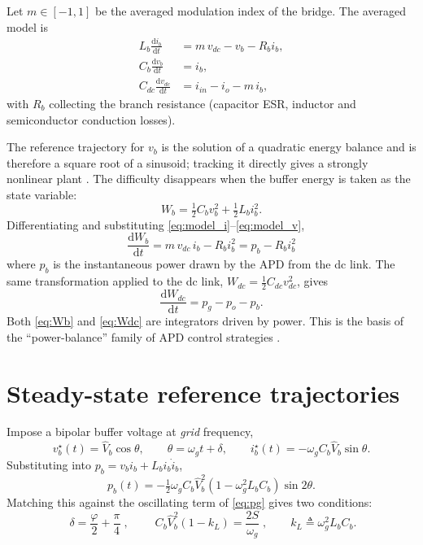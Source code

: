 \documentclass[11pt,a4paper]{article}
\newcommand{\dif}{\mathrm{d}}
\begin{document}
Let $m\in[-1,1]$ be the averaged modulation index of the bridge. The averaged
model is
\begin{align}
L_b\frac{\dif i_b}{\dif t} &= m\,v_{dc} - v_b - R_b i_b, \label{eq:model_i}\\
C_b\frac{\dif v_b}{\dif t} &= i_b, \label{eq:model_v}\\
C_{dc}\frac{\dif v_{dc}}{\dif t} &= i_{in} - i_o - m\,i_b, \label{eq:model_vdc}
\end{align}
with $R_b$ collecting the branch resistance (capacitor ESR, inductor and
semiconductor conduction losses).

The reference trajectory for $v_b$ is the solution of a quadratic energy balance
and is therefore a square root of a sinusoid; tracking it directly gives a
strongly nonlinear plant \cite{yuan2019nonlinear}. The difficulty disappears
when the buffer energy is taken as the state variable:
\begin{equation}
W_b = \tfrac12 C_b v_b^2 + \tfrac12 L_b i_b^2 .
\end{equation}
Differentiating and substituting \eqref{eq:model_i}--\eqref{eq:model_v},
\begin{equation}
\boxed{\;\frac{\dif W_b}{\dif t} = m\,v_{dc}\,i_b - R_b i_b^2 = p_b - R_b i_b^2\;}
\label{eq:Wb}
\end{equation}
where $p_b$ is the instantaneous power drawn by the APD from the dc link. The
same transformation applied to the dc link, $W_{dc}=\tfrac12 C_{dc}v_{dc}^2$,
gives
\begin{equation}
\frac{\dif W_{dc}}{\dif t} = p_g - p_o - p_b .
\label{eq:Wdc}
\end{equation}
Both \eqref{eq:Wb} and \eqref{eq:Wdc} are integrators driven by power. This is
the basis of the ``power-balance'' family of APD control strategies
\cite{liu2021review,wang2011ripple}.

\section{Steady-state reference trajectories}

Impose a bipolar buffer voltage at \emph{grid} frequency,
\begin{equation}
v_b^\star(t) = \hat V_b\cos\theta, \qquad \theta = \omega_g t + \delta ,
\qquad i_b^\star(t) = -\omega_g C_b \hat V_b \sin\theta .
\label{eq:refs}
\end{equation}
Substituting into $p_b = v_b i_b + L_b i_b \dot i_b$,
\begin{equation}
p_b(t) = -\tfrac12 \omega_g C_b \hat V_b^2 \left(1-\omega_g^2 L_b C_b\right)\sin 2\theta .
\end{equation}
Matching this against the oscillating term of \eqref{eq:pg} gives two conditions:
\begin{equation}
\boxed{\;\delta = \frac{\varphi}{2} + \frac{\pi}{4}\;},
\qquad
\boxed{\;C_b\hat V_b^2\left(1-k_L\right) = \frac{2S}{\omega_g}\;},
\qquad k_L \triangleq \omega_g^2 L_b C_b .
\label{eq:design}
\end{equation}
\end{document}
